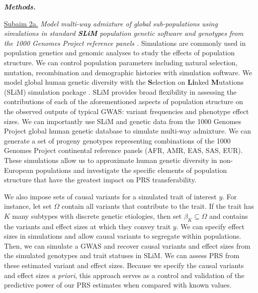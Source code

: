 \documentclass[11pt]{article}  %
\newlength\tindent
\renewcommand{\indent}{\hspace*{\tindent}}
\begin{document}

\indent \textbf{\textit{Methods.}} 

\indent \underline{Subaim 2a.} \textit{Model multi-way admixture of global sub-populations using simulations in standard \textbf{SLiM} population genetic software \cite{haller_slim_2019} and genotypes from the 1000 Genomes Project reference panels \cite{noauthor_global_2015}.} Simulations are commonly used in population genetics and genomic analyses to study the effects of population structure. We can control population parameters including natural selection, mutation, recombination and demographic histories with simulation software. We model global human genetic diversity with the \textbf{S}election on \textbf{Li}nked \textbf{M}utations (SLiM) simulation package \cite{haller_slim_2019}. SLiM provides broad flexibility in assessing the contributions of each of the aforementioned aspects of population structure on the observed outputs of typical GWAS: variant frequencies and phenotype effect sizes. We can importantly use SLiM and genetic data from the 1000 Genomes Project \cite{noauthor_global_2015} global human genetic database to simulate multi-way admixture. We can generate a set of progeny genotypes representing combinations of the 1000 Genomes Project continental reference panels (AFR, AMR, EAS, SAS, EUR). These simulations allow us to approximate human genetic diversity in non-European populations and investigate the specific elements of population structure that have the greatest impact on PRS transferability.

We also impose sets of causal variants for a simulated trait of interest $y$. For instance, let set $\Omega$ contain all variants that contribute to the trait. If the trait has $K$ many subtypes with discrete genetic etiologies, then set $\beta_K \subseteq \Omega$ and contains the variants and effect sizes at which they convey trait $y$. We can specify effect sizes in simulations and allow causal variants to segregate within populations. Then, we can simulate a GWAS and recover causal variants and effect sizes from the simulated genotypes and trait statuses in SLiM. We can assess PRS from these estimated variant and effect sizes. Because we specify the causal variants and effect sizes \textit{a priori}, this approach serves as a control and validation of the predictive power of our PRS estimates when compared with known values. 
\end{document}
